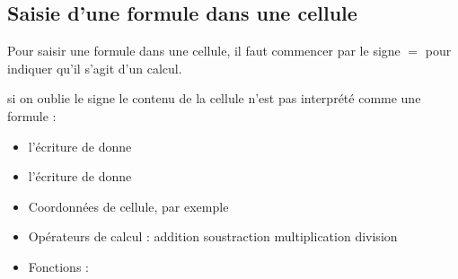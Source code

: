 \subsection{Saisie d'une formule dans une cellule} %

\begin{propriete}
   Pour saisir une formule dans une cellule, il faut commencer par le signe {\blue $=$} pour indiquer qu'il s'agit d'un calcul.
\end{propriete}
  
\begin{remarque}
    si on oublie le signe \cell{\texttt{=}} le contenu de la cellule n'est pas interprété comme une formule : 
    \begin{itemize}
       \item l'écriture de  donne\,
       \item l'écriture de  donne\,
    \end{itemize}
\end{remarque}   

\bigskip

{\renewcommand{\StringDOCUMENTATION}{Exemples d'éléments}
\begin{documentation}
   \begin{itemize}
      \item Coordonnées de cellule, par exemple 
      \item Opérateurs de calcul : addition \cell{\texttt{+}} soustraction \cell{\texttt{-}} multiplication \cell{\texttt{*}} division \cell{\texttt{/}}
      \item Fonctions :   \\ [-6mm]
   \end{itemize}
\end{documentation}}

